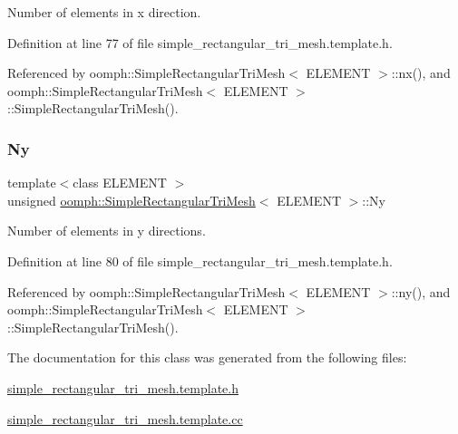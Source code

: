 Number of elements in x direction. 



Definition at line 77 of file simple\+\_\+rectangular\+\_\+tri\+\_\+mesh.\+template.\+h.



Referenced by oomph\+::\+Simple\+Rectangular\+Tri\+Mesh$<$ E\+L\+E\+M\+E\+N\+T $>$\+::nx(), and oomph\+::\+Simple\+Rectangular\+Tri\+Mesh$<$ E\+L\+E\+M\+E\+N\+T $>$\+::\+Simple\+Rectangular\+Tri\+Mesh().

\mbox{\label{classoomph_1_1SimpleRectangularTriMesh_ac180c4ab5947c4417d912bc75621fc7e}} 
\subsubsection{\texorpdfstring{Ny}{Ny}}
{\footnotesize\ttfamily template$<$class E\+L\+E\+M\+E\+NT $>$ \\
unsigned \hyperlink{classoomph_1_1SimpleRectangularTriMesh}{oomph\+::\+Simple\+Rectangular\+Tri\+Mesh}$<$ E\+L\+E\+M\+E\+NT $>$\+::Ny\hspace{0.3cm}{\ttfamily [private]}}



Number of elements in y directions. 



Definition at line 80 of file simple\+\_\+rectangular\+\_\+tri\+\_\+mesh.\+template.\+h.



Referenced by oomph\+::\+Simple\+Rectangular\+Tri\+Mesh$<$ E\+L\+E\+M\+E\+N\+T $>$\+::ny(), and oomph\+::\+Simple\+Rectangular\+Tri\+Mesh$<$ E\+L\+E\+M\+E\+N\+T $>$\+::\+Simple\+Rectangular\+Tri\+Mesh().



The documentation for this class was generated from the following files\+:\begin{DoxyCompactItemize}
\item 
\hyperlink{simple__rectangular__tri__mesh_8template_8h}{simple\+\_\+rectangular\+\_\+tri\+\_\+mesh.\+template.\+h}\item 
\hyperlink{simple__rectangular__tri__mesh_8template_8cc}{simple\+\_\+rectangular\+\_\+tri\+\_\+mesh.\+template.\+cc}\end{DoxyCompactItemize}

